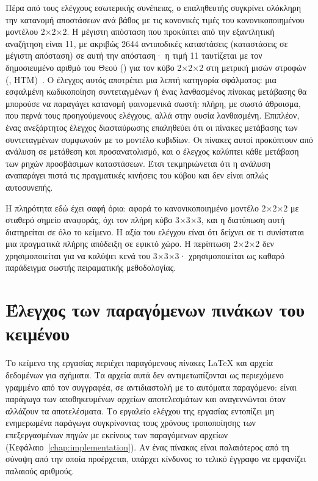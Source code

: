 Πέρα από τους ελέγχους εσωτερικής συνέπειας, ο επαληθευτής συγκρίνει ολόκληρη την κατανομή αποστάσεων ανά βάθος με τις κανονικές τιμές του κανονικοποιημένου μοντέλου 2×2×2. Η μέγιστη απόσταση που προκύπτει από την εξαντλητική αναζήτηση είναι 11, με ακριβώς 2644 αντιποδικές καταστάσεις (καταστάσεις σε μέγιστη απόσταση) σε αυτή την απόσταση· η τιμή 11 ταυτίζεται με τον δημοσιευμένο αριθμό του Θεού () για τον κύβο 2×2×2 στη μετρική μισών στροφών (, HTM)~\cite{randelshoferPocketCube}. Ο έλεγχος αυτός αποτρέπει μια λεπτή κατηγορία σφάλματος: μια εσφαλμένη κωδικοποίηση συντεταγμένων ή ένας λανθασμένος πίνακας μετάβασης θα μπορούσε να παραγάγει κατανομή φαινομενικά σωστή: πλήρη, με σωστό άθροισμα, που περνά τους προηγούμενους ελέγχους, αλλά στην ουσία λανθασμένη. Επιπλέον, ένας ανεξάρτητος έλεγχος διασταύρωσης επαληθεύει ότι οι πίνακες μετάβασης των συντεταγμένων συμφωνούν με το μοντέλο κυβιδίων. Οι πίνακες αυτοί προκύπτουν από ανάλυση σε μετάθεση και προσανατολισμό, και ο έλεγχος καλύπτει κάθε μετάβαση των ρηχών προσβάσιμων καταστάσεων. Έτσι τεκμηριώνεται ότι η ανάλυση αναπαράγει πιστά τις πραγματικές κινήσεις του κύβου και δεν είναι απλώς αυτοσυνεπής.

Η πληρότητα εδώ έχει σαφή όρια: αφορά το κανονικοποιημένο μοντέλο 2×2×2 με σταθερό σημείο αναφοράς, όχι τον πλήρη κύβο 3×3×3, και η διατύπωση αυτή διατηρείται σε όλο το κείμενο. Η αξία του ελέγχου είναι ότι δείχνει σε τι συνίσταται μια πραγματικά πλήρης απόδειξη σε εφικτό χώρο. Η περίπτωση 2×2×2 δεν χρησιμοποιείται για να καλύψει κενά του 3×3×3· χρησιμοποιείται ως καθαρό παράδειγμα σωστής πειραματικής μεθοδολογίας.

\section{Έλεγχος των παραγόμενων πινάκων του κειμένου}
\label{sec:validation-artifacts}
Το κείμενο της εργασίας περιέχει παραγόμενους πίνακες LaTeX και αρχεία δεδομένων για σχήματα. Τα αρχεία αυτά δεν αντιμετωπίζονται ως περιεχόμενο γραμμένο από τον συγγραφέα, σε αντιδιαστολή με το αυτόματα παραγόμενο: είναι παράγωγα των αποθηκευμένων αρχείων αποτελεσμάτων και αναγεννώνται όταν αλλάζουν τα αποτελέσματα. Το εργαλείο ελέγχου της εργασίας εντοπίζει μη ενημερωμένα παράγωγα συγκρίνοντας τους χρόνους τροποποίησης των επεξεργασμένων πηγών με εκείνους των παραγόμενων αρχείων (Κεφάλαιο~\ref{chap:implementation}). Αν ένας πίνακας είναι παλαιότερος από τη σύνοψη από την οποία προέρχεται, υπάρχει κίνδυνος το τελικό έγγραφο να εμφανίζει παλαιούς αριθμούς.

